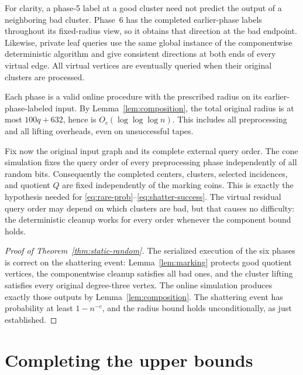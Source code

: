 \documentclass[11pt]{article}
\theoremstyle{definition}
\begin{document}
For clarity, a phase-5 label at a good cluster need not predict the output
of a neighboring bad cluster. Phase~6 has the completed earlier-phase
labels throughout its fixed-radius view, so it obtains that direction at
the bad endpoint. Likewise, private leaf queries use the same global
instance of the componentwise deterministic algorithm and give consistent
directions at both ends of every virtual edge. All virtual vertices are
eventually queried when their original clusters are processed.

Each phase is a valid online procedure with the prescribed radius on its
earlier-phase-labeled input. By Lemma~\ref{lem:composition}, the total
original radius is at most $100q+632$, hence is
$O_c(\log\log\log n)$. This includes all preprocessing and all lifting
overheads, even on unsuccessful tapes.

Fix now the original input graph and its complete external query order.
The cone simulation fixes the query order of every preprocessing phase
independently of all random bits. Consequently the completed centers,
clusters, selected incidences, and quotient $Q$ are fixed independently of
the marking coins. This is exactly the hypothesis needed for
\eqref{eq:rare-prob}--\eqref{eq:shatter-success}. The virtual residual query
order may depend on which clusters are bad, but that causes no difficulty:
the deterministic cleanup works for every order whenever the component
bound holds.

\begin{proof}[Proof of Theorem~\ref{thm:static-random}]
The serialized execution of the six phases is correct on the shattering
event: Lemma~\ref{lem:marking} protects good quotient vertices, the
componentwise cleanup satisfies all bad ones, and the cluster lifting
satisfies every original degree-three vertex. The online simulation
produces exactly those outputs by Lemma~\ref{lem:composition}. The
shattering event has probability at least $1-n^{-c}$, and the radius bound
holds unconditionally, as just established.
\end{proof}

\section{Completing the upper bounds}\label{sec:conclude}
\end{document}
